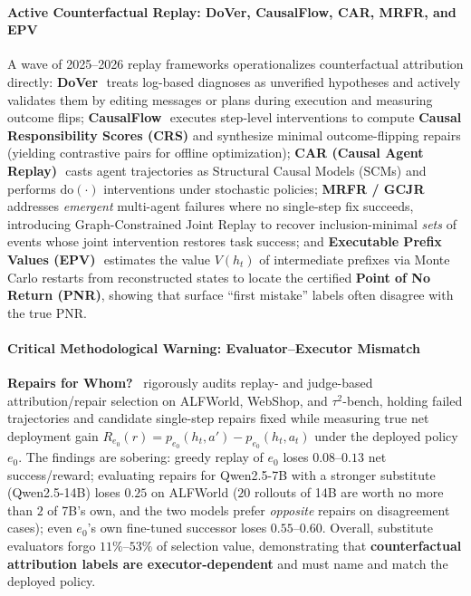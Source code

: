 \paragraph{Active Counterfactual Replay: DoVer, CausalFlow, CAR, MRFR, and EPV}
A wave of 2025--2026 replay frameworks operationalizes counterfactual attribution directly:
\textbf{DoVer}~\citep{ma2025dover}\,\webtag treats log-based diagnoses as unverified hypotheses and actively validates them by editing messages or plans during execution and measuring outcome flips;
\textbf{CausalFlow}~\citep{bonagiri2026causalflow}\,\webtag executes step-level interventions to compute \textbf{Causal Responsibility Scores (CRS)} and synthesize minimal outcome-flipping repairs (yielding contrastive pairs for offline optimization);
\textbf{CAR (Causal Agent Replay)}~\citep{shah2026car}\,\webtag casts agent trajectories as Structural Causal Models (SCMs) and performs $\text{do}(\cdot)$ interventions under stochastic policies;
\textbf{MRFR / GCJR}~\citep{li2026mrfr}\,\webtag addresses \emph{emergent} multi-agent failures where no single-step fix succeeds, introducing Graph-Constrained Joint Replay to recover inclusion-minimal \emph{sets} of events whose joint intervention restores task success; and
\textbf{Executable Prefix Values (EPV)}~\citep{shen2026epv}\,\webtag estimates the value $V(h_t)$ of intermediate prefixes via Monte Carlo restarts from reconstructed states to locate the certified \textbf{Point of No Return (PNR)}, showing that surface ``first mistake'' labels often disagree with the true PNR.

\paragraph{Critical Methodological Warning: Evaluator--Executor Mismatch~\citep{liao2026repairs}}
\textbf{Repairs for Whom?}~\citep{liao2026repairs} rigorously audits replay- and judge-based attribution/repair selection on ALFWorld, WebShop, and $\tau^2$-bench, holding failed trajectories and candidate single-step repairs fixed while measuring true net deployment gain $R_{e_0}(r) = p_{e_0}(h_t, a') - p_{e_0}(h_t, a_t)$ under the deployed policy $e_0$. The findings are sobering: greedy replay of $e_0$ loses $0.08$--$0.13$ net success/reward; evaluating repairs for Qwen2.5-7B with a stronger substitute (Qwen2.5-14B) loses $0.25$ on ALFWorld ($20$ rollouts of 14B are worth no more than $2$ of 7B's own, and the two models prefer \emph{opposite} repairs on disagreement cases); even $e_0$'s own fine-tuned successor loses $0.55$--$0.60$. Overall, substitute evaluators forgo $11\%$--$53\%$ of selection value, demonstrating that \textbf{counterfactual attribution labels are executor-dependent} and must name and match the deployed policy.

